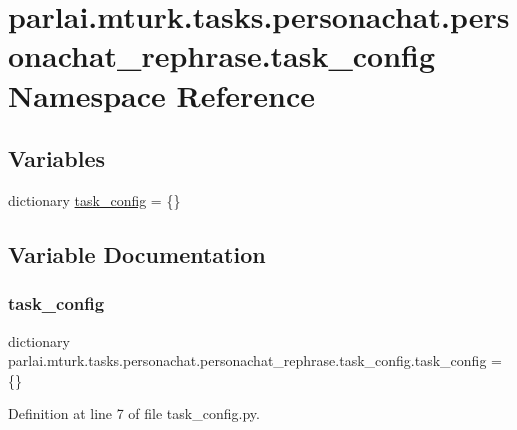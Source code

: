 \hypertarget{namespaceparlai_1_1mturk_1_1tasks_1_1personachat_1_1personachat__rephrase_1_1task__config}{}\section{parlai.\+mturk.\+tasks.\+personachat.\+personachat\+\_\+rephrase.\+task\+\_\+config Namespace Reference}
\label{namespaceparlai_1_1mturk_1_1tasks_1_1personachat_1_1personachat__rephrase_1_1task__config}
\subsection*{Variables}
\begin{DoxyCompactItemize}
\item 
dictionary \hyperlink{namespaceparlai_1_1mturk_1_1tasks_1_1personachat_1_1personachat__rephrase_1_1task__config_a08481e819068c9ead3fc6bb42c0f42e2}{task\+\_\+config} = \{\}
\end{DoxyCompactItemize}


\subsection{Variable Documentation}
\mbox{\label{namespaceparlai_1_1mturk_1_1tasks_1_1personachat_1_1personachat__rephrase_1_1task__config_a08481e819068c9ead3fc6bb42c0f42e2}} 
\subsubsection{\texorpdfstring{task\+\_\+config}{task\_config}}
{\footnotesize\ttfamily dictionary parlai.\+mturk.\+tasks.\+personachat.\+personachat\+\_\+rephrase.\+task\+\_\+config.\+task\+\_\+config = \{\}}



Definition at line 7 of file task\+\_\+config.\+py.

